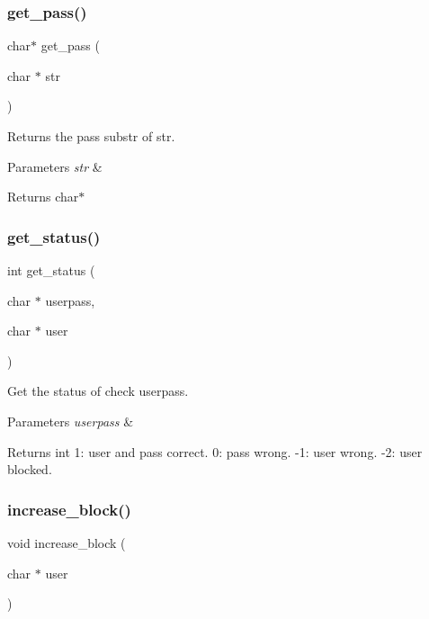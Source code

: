 \subsubsection{get\+\_\+pass()}
{\footnotesize\ttfamily char$\ast$ get\+\_\+pass (\begin{DoxyParamCaption}\item[{char $\ast$}]{str }\end{DoxyParamCaption})}



Returns the pass substr of str. 


\begin{DoxyParams}{Parameters}
{\em str} & \\
\hline
\end{DoxyParams}
\begin{DoxyReturn}{Returns}
char$\ast$ 
\end{DoxyReturn}
\mbox{\label{auth_8h_ac2d257768c5b44d17c6fe989707468a5}} 
\subsubsection{get\+\_\+status()}
{\footnotesize\ttfamily int get\+\_\+status (\begin{DoxyParamCaption}\item[{char $\ast$}]{userpass,  }\item[{char $\ast$}]{user }\end{DoxyParamCaption})}



Get the status of check userpass. 


\begin{DoxyParams}{Parameters}
{\em userpass} & \\
\hline
\end{DoxyParams}
\begin{DoxyReturn}{Returns}
int 1\+: user and pass correct. 0\+: pass wrong. -\/1\+: user wrong. -\/2\+: user blocked. 
\end{DoxyReturn}
\mbox{\label{auth_8h_a7262d58710ad875161637d4d2ae75009}} 
\subsubsection{increase\+\_\+block()}
{\footnotesize\ttfamily void increase\+\_\+block (\begin{DoxyParamCaption}\item[{char $\ast$}]{user }\end{DoxyParamCaption})}



